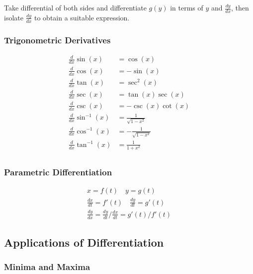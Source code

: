 \documentclass[../main]{subfiles}
\begin{document}
	Take differential of both sides and differentiate \(g(y)\) in terms of \(y\) and \(\frac{dy}{dx}\), then isolate \(\frac{dy}{dx}\) to obtain a suitable expression.

	\subsubsection{Trigonometric Derivatives}

	\begin{equation*} \begin{aligned}
		\frac{d}{dx} \sin(x) &= \cos(x) \\
		\frac{d}{dx} \cos(x) &= -\sin(x) \\
		\frac{d}{dx} \tan(x) &= \sec^2(x) \\
		\frac{d}{dx} \sec(x) &= \tan(x)\sec(x) \\
		\frac{d}{dx} \csc(x) &= -\csc(x)\cot(x) \\
		\frac{d}{dx} \sin^{-1}(x) &= \frac{1}{\sqrt{1-x^2}} \\
		\frac{d}{dx} \cos^{-1}(x) &= -\frac{1}{\sqrt{1-x^2}}  \\
		\frac{d}{dx} \tan^{-1}(x) &= \frac{1}{1+x^2}  \\
	\end{aligned} \end{equation*}

	\subsubsection{Parametric Differentiation}

	\begin{equation*} \begin{gathered}
		x = f(t) \quad y = g(t) \\
		\frac{dx}{dt} = f'(t) \quad \frac{dy}{dt} = g'(t)  \\
		\frac{dy}{dx} = \frac{dy}{dt} / \frac{dx}{dt} = g'(t) / f'(t) 
	\end{gathered} \end{equation*}

\subsection{Applications of Differentiation}

	\subsubsection{Minima and Maxima}
\end{document}
